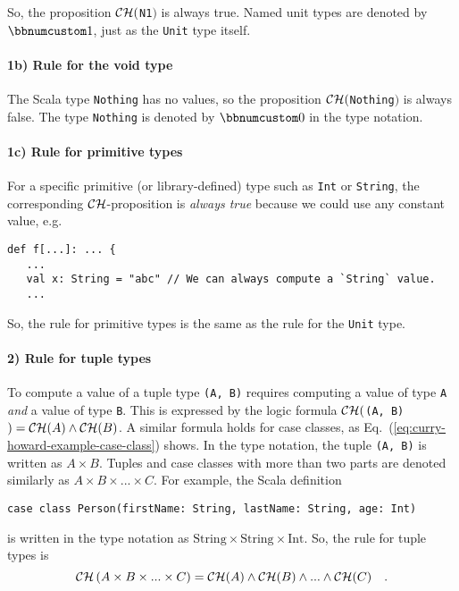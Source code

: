 \noindent So, the proposition ${\cal CH}($\lstinline!N1!$)$ is
always true. Named unit types are denoted by $\bbnum 1$, just as
the \lstinline!Unit! type itself.

\paragraph{1b) Rule for the void type}

The Scala type \lstinline!Nothing! has no values, so the proposition
${\cal CH}($\lstinline!Nothing!$)$ is always false. The type \lstinline!Nothing!
is denoted by $\bbnum 0$ in the type notation.

\paragraph{1c) Rule for primitive types}

For a specific primitive (or library-defined) type such as \lstinline!Int!
or \lstinline!String!, the corresponding ${\cal CH}$-proposition
is \emph{always true} because we could use any constant value, e.g.
\begin{lstlisting}
def f[...]: ... {
   ...
   val x: String = "abc" // We can always compute a `String` value.
   ...
\end{lstlisting}
So, the rule for primitive types is the same as the rule for the \lstinline!Unit!
type.

\paragraph{2) Rule for tuple types}

To compute a value of a tuple type \lstinline!(A, B)! requires computing
a value of type \lstinline!A! \emph{and} a value of type \lstinline!B!.
This is expressed by the logic formula ${\cal CH}($\lstinline!(A, B)!$)={\cal CH}(A)\wedge{\cal CH}(B)$.
A similar formula holds for case classes, as Eq.~(\ref{eq:curry-howard-example-case-class})
shows. In the type notation, the tuple \lstinline!(A, B)! is written
as $A\times B$. Tuples and case classes with more than two parts
are denoted similarly as $A\times B\times...\times C$. For example,
the Scala definition
\begin{lstlisting}
case class Person(firstName: String, lastName: String, age: Int)
\end{lstlisting}
is written in the type notation as $\text{String}\times\text{String}\times\text{Int}$.
So, the rule for tuple types is
\[
{\cal CH}\left(A\times B\times...\times C\right)={\cal CH}(A)\wedge{\cal CH}(B)\wedge...\wedge{\cal CH}(C)\quad.
\]


